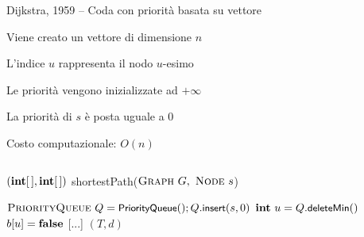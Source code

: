 \begin{frame}{Dijkstra, 1959 -- Coda con priorità basata su vettore}

\vspace{-9pt}
\begin{myboxtitle}
\BI
\item Viene creato un vettore di dimensione $n$
\item L'indice $u$ rappresenta il nodo $u$-esimo
\item Le priorità vengono inizializzate ad $+\infty$
\item La priorità di $s$ è posta uguale a $0$
\item Costo computazionale: $O(n)$
\EI
\end{myboxtitle}

\small
\vspace{-18pt}
\begin{columns}
\small
\begin{Procedure}
\caption[A]{$(\INTARRAY, \INTARRAY)$ \textsf{shortestPath}($\textsc{Graph}\ G,\ \textsc{Node}\ s$)}
\alert{$\textsc{PriorityQueue}\ Q = \textsf{{\small PriorityQueue}}(); Q.\textsf{{\small insert}}(s, 0)$}\;
{
  $\INTEGER\ u = Q.\heapdeletemin()$\;
  $b[u] = \FALSE$\;
  {
    {
      [...]
    }
  }
}
\Return $(T,d)$
\end{Procedure}
\end{columns}




\end{frame}


